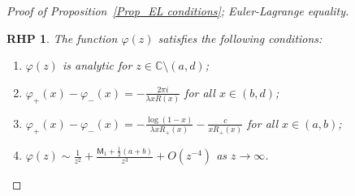 \documentclass{amsart}
\theoremstyle{plain}
\newtheorem{rhp}{RHP}[section]
\theoremstyle{remark}
\numberwithin{equation}{section}
\begin{document}
\begin{proof}[Proof of Proposition~\ref{Prop_EL conditions}; Euler-Lagrange equality]
\begin{rhp}
\label{rhp:varphi}
    The function $\varphi(z)$ satisfies the following conditions:
    \begin{enumerate}
        \item $\varphi(z)$ is analytic for $z\in \mathbb{C}\setminus(a,d)$;
        \smallskip 
        \item $\displaystyle \varphi_+(x)-\varphi_-(x) = -\frac{2\pi i}{\lambda xR(x)}$ for all $x\in(b,d)$;
        \smallskip 
        \item $\displaystyle \varphi_+(x)-\varphi_-(x) = - \frac{\log(1-x)}{\lambda xR_+(x)} -\frac{c}{xR_+(x)}$ for all $x\in(a,b)$; 
        \smallskip 
        \item $\displaystyle \varphi(z) \sim \frac{1}{z^2} + \frac{ \mathsf{M}_1 + \frac{1}{2}(a+b)}{z^3} + O(z^{-4})$ as $z \to \infty$. 
    \end{enumerate}
\end{rhp}


\end{proof}
\end{document}

